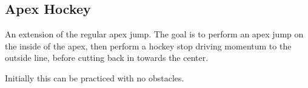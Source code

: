 \subsection{Apex Hockey}

An extension of the regular apex jump. 
The goal is to perform an apex jump on the inside of the apex, then perform a hockey stop driving momentum to the outside line, before cutting back in towards the center.   


Initially this can be practiced with no obstacles. 
